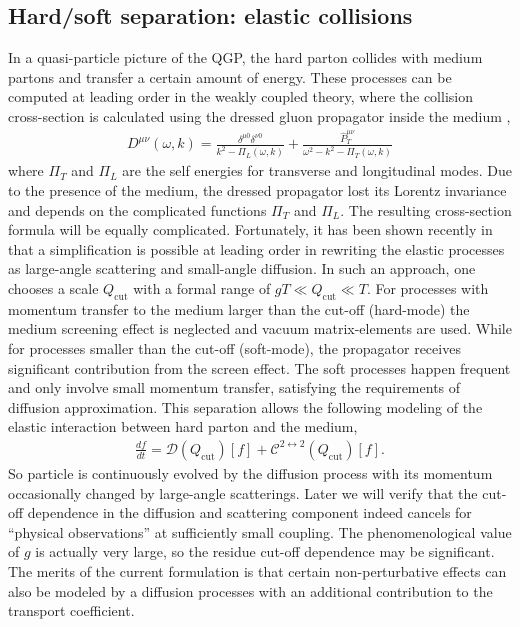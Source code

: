 \subsection{Hard/soft separation: elastic collisions}
In a quasi-particle picture of the QGP, the hard parton collides with medium partons and transfer a certain amount of energy.
These processes can be computed at leading order in the weakly coupled theory, where the collision cross-section is calculated using the dressed gluon propagator inside the medium \cite{PhysRevD.44.1298},
\begin{eqnarray}
D^{\mu\nu}(\omega, k) = \frac{\delta^{\mu 0}\delta^{\nu 0}}{k^2 - \Pi_L(\omega, k)} + \frac{\hat{P}_T^{\mu\nu}}{\omega^2 - k^2 - \Pi_T(\omega, k)}
\end{eqnarray}
where $\Pi_T$ and $\Pi_L$ are the self energies for transverse and longitudinal modes.
Due to the presence of the medium, the dressed propagator lost its Lorentz invariance and depends on the complicated functions $\Pi_T$ and $\Pi_L$.
The resulting cross-section formula will be equally complicated.
Fortunately, it has been shown recently in \cite{Ghiglieri:2015ala} that a simplification is possible at leading order in rewriting the elastic processes as large-angle scattering and small-angle diffusion.
In such an approach, one chooses a scale $Q_\textrm{cut}$ with a formal range of $gT \ll Q_\textrm{cut} \ll T$.
For processes with momentum transfer to the medium larger than the cut-off  (hard-mode) the medium screening effect is neglected and vacuum matrix-elements are used.
While for processes smaller than the cut-off (soft-mode), the propagator receives significant contribution from the screen effect.
The soft processes happen frequent and only involve small momentum transfer, satisfying the requirements of diffusion approximation.
This separation allows the following modeling of the elastic interaction between hard parton and the medium,
\begin{eqnarray}
\frac{df}{dt} = \mathcal{D}(Q_{\textrm{cut}})[f] + \mathcal{C}^{2\leftrightarrow 2}(Q_{\textrm{cut}})[f].
\end{eqnarray}
So particle is continuously evolved by the diffusion process with its momentum occasionally changed by large-angle scatterings.
Later we will verify that the cut-off dependence in the diffusion and scattering component indeed cancels for ``physical observations'' at sufficiently small coupling.
The phenomenological value of $g$ is actually very large, so the residue cut-off dependence may be significant. 
The merits of the current formulation is that certain  non-perturbative effects can also be modeled by a diffusion processes with an additional contribution to the transport coefficient.

